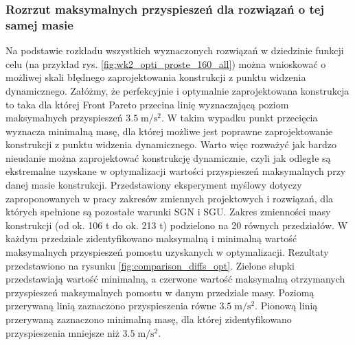 \subsubsection{Rozrzut maksymalnych przyspieszeń dla rozwiązań o tej samej masie}
Na podstawie rozkładu wszystkich wyznaczonych rozwiązań w dziedzinie funkcji celu (na przykład rys. \ref{fig:wk2_opti_proste_160_all}) można wnioskować o możliwej skali błędnego zaprojektowania konstrukcji z punktu widzenia dynamicznego. Załóżmy, że perfekcyjnie i optymalnie zaprojektowana konstrukcja to taka dla której Front Pareto przecina linię wyznaczającą poziom maksymalnych przyspieszeń $3.5\;\mathrm{m/s^2}$. W takim wypadku punkt przecięcia wyznacza minimalną masę, dla której możliwe jest poprawne zaprojektowanie konstrukcji z punktu widzenia dynamicznego. Warto więc rozważyć jak bardzo nieudanie można zaprojektować konstrukcję dynamicznie, czyli jak odległe są ekstremalne uzyskane w optymalizacji wartości przyspieszeń maksymalnych przy danej masie konstrukcji. Przedstawiony eksperyment myślowy dotyczy zaproponowanych w pracy zakresów zmiennych projektowych i rozwiązań, dla których spełnione są pozostałe warunki SGN i SGU. Zakres zmienności masy konstrukcji (od ok. 106 t do ok. 213 t) podzielono na 20 równych przedziałów. W każdym przedziale zidentyfikowano maksymalną i minimalną wartość maksymalnych przyspieszeń pomostu uzyskanych w optymalizacji. Rezultaty przedstawiono na rysunku \ref{fig:comparison_diffs_opt}. Zielone słupki przedstawiają wartość minimalną, a czerwone wartość maksymalną otrzymanych przyspieszeń maksymalnych pomostu w danym przedziale masy. Poziomą przerywaną linią zaznaczono przyspieszenia równe $3.5\;\mathrm{m/s^2}$. Pionową linią przerywaną zaznaczono minimalną masę, dla której zidentyfikowano przyspieszenia mniejsze niż $3.5\;\mathrm{m/s^2}$.

